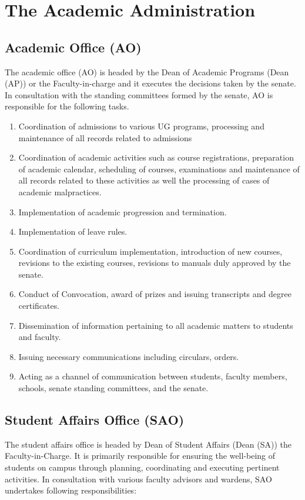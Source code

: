 \section{The Academic Administration}

\subsection{Academic Office (AO)}

The academic office (AO) is headed by the Dean of Academic Programs (Dean (AP)) or the Faculty-in-charge and it executes the decisions taken by the senate. In consultation with the standing committees formed by the senate, AO is responsible for the following tasks.

\begin{enumerate}
	\item Coordination of admissions to various UG programs, processing and maintenance of all records related to admissions
	\item Coordination of academic activities such as course registrations, preparation of academic calendar, scheduling of courses, examinations and maintenance of all records related to these activities as well the processing of cases of academic malpractices.
	\item Implementation of academic progression and termination.
	\item Implementation of leave rules.
	\item Coordination of curriculum implementation, introduction of new courses, revisions to the existing courses, revisions to manuals duly approved by the senate.
	\item Conduct of Convocation, award of prizes and issuing transcripts and degree certificates.
	\item Dissemination of information pertaining to all academic matters to students and faculty.
	\item Issuing necessary communications including circulars, orders. 
	\item Acting as a channel of communication between students, faculty members, schools, senate standing committees, and the senate.
\end{enumerate}

\subsection{Student Affairs Office (SAO)}

The student affairs office is headed by Dean of Student Affairs (Dean (SA)) the Faculty-in-Charge. It is primarily responsible for ensuring the well-being of students on campus through planning, coordinating and executing pertinent activities. In consultation with various faculty advisors and wardens, SAO undertakes following responsibilities:

